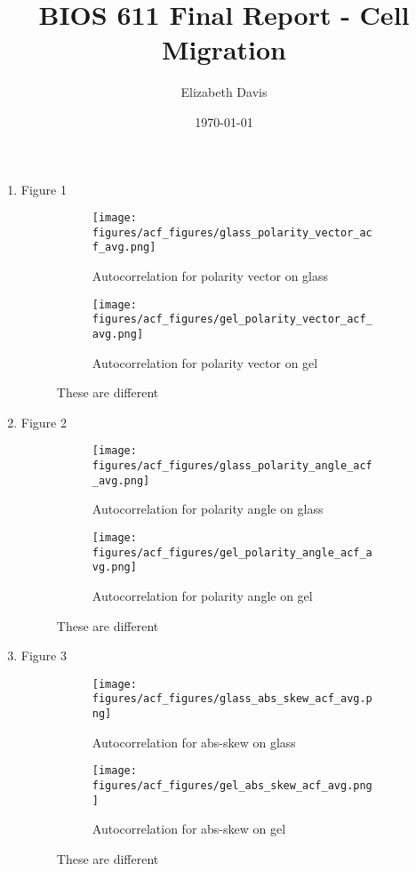 \documentclass[12pt]{article}
\title{BIOS 611 Final Report - Cell Migration}
\author{Elizabeth Davis}
\date{\today}
\begin{document}
\maketitle
\begin{enumerate}
\item Figure 1
\begin{figure}[h!]
    \centering
    \begin{subfigure}[b]{0.4\linewidth}
      \texttt{[image: figures/acf\_figures/glass\_polarity\_vector\_acf\_avg.png]}
      \caption{Autocorrelation for polarity vector on glass}
    \end{subfigure}
    \begin{subfigure}[b]{0.4\linewidth}
      \texttt{[image: figures/acf\_figures/gel\_polarity\_vector\_acf\_avg.png]}
      \caption{Autocorrelation for polarity vector on gel}
    \end{subfigure}
    \caption{These are different}
    \label{fig:acf_polvec}
  \end{figure}

\item Figure 2
\begin{figure}[h!]
    \centering
    \begin{subfigure}[b]{0.4\linewidth}
      \texttt{[image: figures/acf\_figures/glass\_polarity\_angle\_acf\_avg.png]}
      \caption{Autocorrelation for polarity angle on glass}
    \end{subfigure}
    \begin{subfigure}[b]{0.4\linewidth}
      \texttt{[image: figures/acf\_figures/gel\_polarity\_angle\_acf\_avg.png]}
      \caption{Autocorrelation for polarity angle on gel}
    \end{subfigure}
    \caption{These are different}
    \label{fig:acf_polang}
  \end{figure}

\item Figure 3
\begin{figure}[h!]
    \centering
    \begin{subfigure}[b]{0.4\linewidth}
      \texttt{[image: figures/acf\_figures/glass\_abs\_skew\_acf\_avg.png]}
      \caption{Autocorrelation for abs-skew on glass}
    \end{subfigure}
    \begin{subfigure}[b]{0.4\linewidth}
      \texttt{[image: figures/acf\_figures/gel\_abs\_skew\_acf\_avg.png]}
      \caption{Autocorrelation for abs-skew on gel}
    \end{subfigure}
    \caption{These are different}
    \label{fig:acf_absskew}
  \end{figure}


\end{enumerate}
\end{document}
